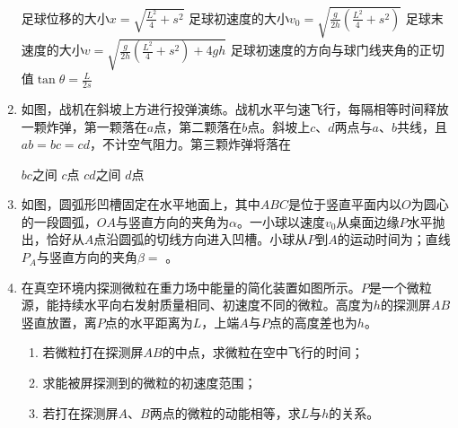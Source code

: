 \begin{enumerate}[leftmargin=0em]
\fourchoices
{足球位移的大小$x = \sqrt { \frac { L ^ { 2 } } { 4 } + s ^ { 2 } }$}
{足球初速度的大小$v _ { 0 } = \sqrt { \frac { g } { 2 h } \left( \frac { L ^ { 2 } } { 4 } + s ^ { 2 } \right) }$}
{足球末速度的大小$v = \sqrt { \frac { g } { 2 h } \left( \frac { L ^ { 2 } } { 4 } + s ^ { 2 } \right) + 4 g h }$}
{足球初速度的方向与球门线夹角的正切值$\tan \theta = \frac { L } { 2 s }$}



\item 
{}
如图，战机在斜坡上方进行投弹演练。战机水平匀速飞行，每隔相等时间释放一颗炸弹，第一颗落在$ a $点，第二颗落在$ b $点。斜坡上$ c $、$ d $两点与$ a $、$ b $共线，且$ ab=bc=cd $，不计空气阻力。第三颗炸弹将落在  
\begin{figure}[h!]
\centering

\end{figure}



\fourchoices
{$ bc $之间}
{$ c $点}
{$ cd $之间}
{$ d $点}


\item 
{}
如图，圆弧形凹槽固定在水平地面上，其中$ ABC $是位于竖直平面内以$ O $为圆心的一段圆弧，$ OA $与竖直方向的夹角为$ \alpha $。一小球以速度$ v_{0} $从桌面边缘$ P $水平抛出，恰好从$ A $点沿圆弧的切线方向进入凹槽。小球从$ P $到$ A $的运动时间为；直线$ P_{A} $与竖直方向的夹角$ \beta = $ \tk{$\arctan ( 2 \cot \alpha )$}。
\begin{figure}[h!]
\centering

\end{figure}



\item 
{}
在真空环境内探测微粒在重力场中能量的简化装置如图所示。$ P $是一个微粒源，能持续水平向右发射质量相同、初速度不同的微粒。高度为$ h $的探测屏$ AB $竖直放置，离$ P $点的水平距离为$ L $，上端$ A $与$ P $点的高度差也为$ h $。
\begin{enumerate}
\renewcommand{\labelenumi}{\arabic{enumi}.}
\item
若微粒打在探测屏$ AB $的中点，求微粒在空中飞行的时间；
\item 
求能被屏探测到的微粒的初速度范围；
\item 
若打在探测屏$ A $、$ B $两点的微粒的动能相等，求$ L $与$ h $的关系。


\end{enumerate}
\end{enumerate}
